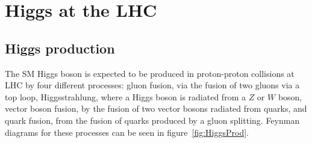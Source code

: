 \section{Higgs at the LHC}
\subsection{Higgs production}

The SM Higgs boson is expected to be produced in proton-proton collisions at LHC by four different processes: gluon fusion, via the fusion of two gluons via a top loop, Higgsstrahlung, where a Higgs boson is radiated from a $Z$ or $W$ boson, vector boson fusion, by the fusion of two vector bosons radiated from quarks, and quark fusion, from the fusion of quarks produced by a gluon splitting. Feynman diagrams for these processes can be seen in figure~\ref{fig:HiggsProd}. 

